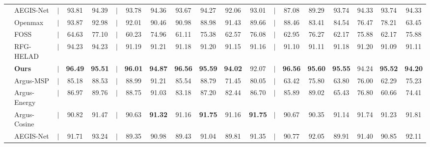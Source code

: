\documentclass{SCIS2026}
\begin{document}
\begin{table}[ht]
\begin{center}
\begin{threeparttable}
{\begin{tabular}{clccccccccccccccccc}
					& AEGIS-Net
					& $|$
					& 93.81 & 94.39
					& $|$
					& 93.78 & 94.36
					& 93.67 & 94.27
					& 92.06 & 93.01
					& $|$
					& 87.08 & 89.29
					& 93.74 & 94.33
					& 93.74 & 94.33 \\ 
					
					& Openmax
					& $|$
					& 93.87 & 92.98
					& $|$
					& 92.01 & 90.46
					& 90.98 & 88.98
					& 91.43 & 89.66
					& $|$
					& 88.46 & 83.41
					& 84.54 & 76.47
					& 78.21 & 63.45 \\ 
					
					& FOSS
					& $|$
					& 64.63 & 77.10
					& $|$
					& 60.23 & 74.96
					& 61.11 & 75.38
					& 62.57 & 76.08
					& $|$
					& 62.95 & 76.27
					& 62.17 & 75.88
					& 62.17 & 75.88 \\ 
					
					& RFG-HELAD
					& $|$
					& 94.23 & 94.23
					& $|$
					& 91.19 & 91.21
					& 91.18 & 91.20
					& 91.15 & 91.16
					& $|$
					& 91.10 & 91.11
					& 91.18 & 91.20
					& 91.09 & 91.11 \\ 
					
					& \textbf{Ours} 
					& $|$
					& \textbf{96.49} & \textbf{95.51} 
					& $|$
					& \textbf{96.01} & \textbf{94.87} 
					& \textbf{96.56} & \textbf{95.59} 
					& \textbf{94.02} & 92.07 
					& $|$
					& \textbf{96.56} & \textbf{95.60} 
					& \textbf{95.55} & 94.24 
					& \textbf{95.52} & \textbf{94.20} \\ 
					\midrule
					
					\multirow{8}{*}{\rotatebox{90}{TII-SSRC-23}} 
					& Argus-MSP
					& $|$
					& 85.18 & 88.53
					& $|$
					& 88.99 & 91.21
					& 85.54 & 88.79
					& 71.45 & 80.05
					& $|$
					& 63.42 & 75.80
					& 63.80 & 76.00
					& 62.29 & 75.23 \\ 
					
					& Argus-Energy
					& $|$
					& 86.97 & 89.76
					& $|$
					& 88.75 & 91.03
					& 83.18 & 87.20
					& 82.44 & 86.70
					& $|$
					& 85.89 & 89.02
					& 65.43 & 76.80
					& 60.66 & 74.41 \\ 
					
					& Argus-Cosine
					& $|$
					& 90.82 & 91.47
					& $|$
					& 90.63 & \textbf{91.32}
					& 91.16 & \textbf{91.75}
					& 91.16 & \textbf{91.75}
					& $|$
					& 90.67 & 90.35
					& 91.14 & 91.74
					& 91.23 & 91.81 \\ 
					
					& AEGIS-Net
					& $|$
					& 91.71 & 93.24
					& $|$
					& 89.35 & 90.98
					& 89.43 & 91.04
					& 89.81 & 91.35
					& $|$
					& 90.77 & 92.05
					& 89.91 & 91.40
					& 90.85 & 92.11 \\ 
					

\end{tabular}}
\end{threeparttable}
\end{center}
\end{table}
\end{document}

